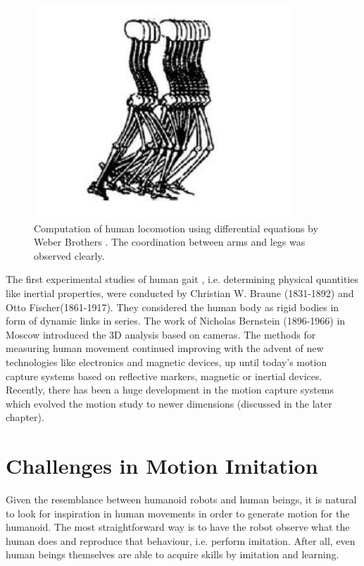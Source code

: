 \begin{figure}[h!]
\centering
\includegraphics[scale=0.4]{images/intro-2.png}\hfill
\caption[Human Locomotion using Differential Equations]{Computation of human locomotion using differential equations by Weber Brothers \cite{alma991010593879705596}. The coordination between arms and legs was observed clearly.}\hfill
\label{motion-coordination}
\end{figure}

The first experimental studies of human gait \cite{alma991010593879705596}, i.e. determining physical quantities 
like inertial properties, were conducted by Christian W. Braune (1831-1892) and Otto Fischer(1861-1917). They 
considered the human body as rigid bodies in form of dynamic links in series. The work of Nicholas Bernstein (1896-1966)
in Moscow introduced the 3D analysis based on cameras. The methods for measuring human movement continued improving 
with the advent of new technologies like electronics and magnetic devices, up until today’s motion capture systems 
based on reflective markers, magnetic or inertial devices. Recently, there has been a huge development in the motion 
capture systems which evolved the motion study to newer dimensions (discussed in the later chapter).




\section{Challenges in Motion Imitation}

Given the resemblance between humanoid robots and human beings, it is natural to look for inspiration in human movements
in order to generate motion for the humanoid. The most straightforward way is to have the robot observe what the human 
does and reproduce that behaviour, i.e. perform imitation. After all, even human beings themselves are able to acquire 
skills by imitation and learning.

